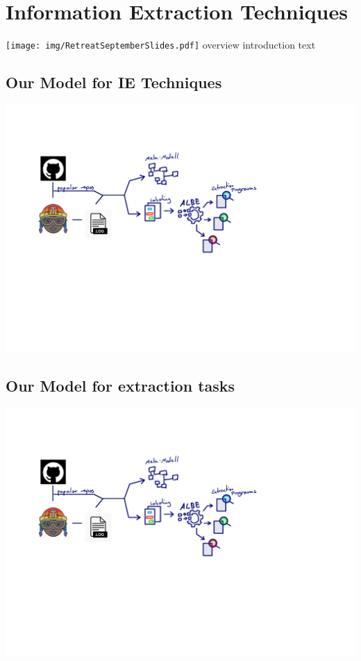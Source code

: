 \documentclass[\myrootdir/main.tex]{subfiles}
\begin{document}
\chapter{Information Extraction Techniques}
\texttt{[image: img/RetreatSeptemberSlides.pdf]}
overview introduction text
\label{models}

\section{Our Model for IE Techniques}
\includegraphics[page=3, width=\textwidth, trim={0.5cm 0.5cm 0.5cm 0.5cm}, clip]{img/flow-of-research.pdf}
\section{Our Model for extraction tasks}
\includegraphics[page=4, width=\textwidth, trim={0.5cm 0.5cm 0.5cm 0.5cm}, clip]{img/flow-of-research.pdf}
\end{document}
